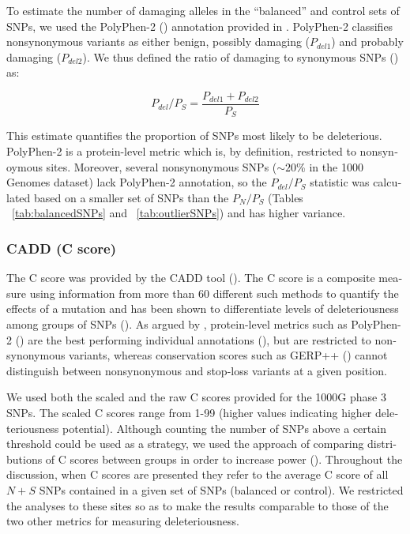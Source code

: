 \begin{refsection}
\begin{otherlanguage}{english}
To estimate the number of damaging alleles in the \enquote{balanced} and control sets of SNPs, we used the PolyPhen-2 (\cite{Adzhubei2010}) annotation provided in \textcite{Kircher2014}. PolyPhen-2 classifies nonsynonymous variants as either benign, possibly damaging ($P_{del1}$) and probably damaging ($P_{del2}$). We thus defined the ratio of damaging to synonymous SNPs (\cite{Lohmueller2008}) as:

\begin{equation}
P_{del}/P_{S}=\frac{P_{del1}+P_{del2}}{P_{S}}
\end{equation}

This estimate quantifies the proportion of SNPs most likely to be deleterious. PolyPhen-2 is a protein-level metric which is, by definition, restricted to nonsynoymous sites. Moreover, several nonsynonymous SNPs ($\sim 20$\% in the 1000 Genomes dataset) lack PolyPhen-2 annotation, so the $P_{del}/P_{S}$ statistic was calculated based on a smaller set of SNPs than the $P_{N}/P_{S}$ (Tables ~\ref{tab:balancedSNPs} and ~\ref{tab:outlierSNPs}) and has higher variance. %

\subsubsection{CADD (C score)}


 The C score was provided by the CADD tool (\cite{Kircher2014}).  The C score is a composite measure using information from more than 60 different such methods to quantify the effects of a mutation and has been shown to differentiate levels of deleteriousness among groups of SNPs (\cite{Kircher2014}). 
As argued by \textcite{Kircher2014}, protein-level metrics such as PolyPhen-2 (\cite{Adzhubei2010}) are the best performing individual annotations (\cite{Kircher2014}), but are restricted to nonsynonymous variants, whereas conservation scores such as GERP++ (\cite{Davydov2010}) cannot distinguish between nonsynonymous and stop-loss variants at a given position.%
 

We used both the scaled and the raw C scores provided for the 1000G phase 3 SNPs. The scaled C scores range from 1-99 (higher values indicating higher deleteriousness potential). Although counting the number of SNPs above a certain threshold could be used as a strategy, we used the approach of comparing distributions of C scores between groups in order to increase power (\cite{Kircher2014}). Throughout the discussion, when C scores are presented they refer to the average C score of all $N+S$ SNPs contained in a given set of SNPs (balanced or control). We restricted the analyses to these sites  so as to make the results comparable to those of the two other metrics for measuring deleteriousness. 



\end{otherlanguage}
\end{refsection}
